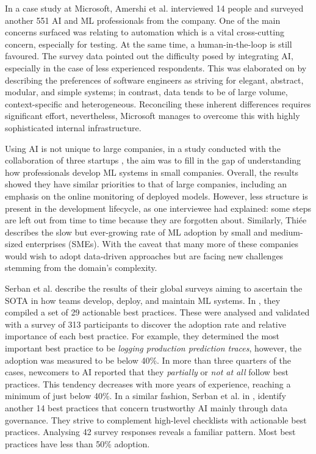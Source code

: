 In a case study at Microsoft, Amershi et al. \cite{amershi2019software} interviewed 14 people and surveyed another 551 AI and ML professionals from the company. One of the main concerns surfaced was relating to automation which is a vital cross-cutting concern, especially for testing. At the same time, a human-in-the-loop is still favoured. The survey data pointed out the difficulty posed by integrating AI, especially in the case of less experienced respondents. This was elaborated on by describing the preferences of software engineers as striving for elegant, abstract, modular, and simple systems; in contrast, data tends to be of large volume, context-specific and heterogeneous. Reconciling these inherent differences requires significant effort, nevertheless, Microsoft manages to overcome this with highly sophisticated internal infrastructure.

Using AI is not unique to large companies, in a study conducted with the collaboration of three startups \cite{de2019understanding}, the aim was to fill in the gap of understanding how professionals develop ML systems in small companies. Overall, the results showed they have similar priorities to that of large companies, including an emphasis on the online monitoring of deployed models. However, less structure is present in the development lifecycle, as one interviewee had explained: some steps are left out from time to time because they are forgotten about.
Similarly, Thiée \cite{thiee2021systematic} describes the slow but ever-growing rate of ML adoption by small and medium-sized enterprises (SMEs). With the caveat that many more of these companies would wish to adopt data-driven approaches but are facing new challenges stemming from the domain's complexity.

Serban et al. \cite{serban2020adoption,serban2021practices} describe the results of their global surveys aiming to ascertain the SOTA in how teams develop, deploy, and maintain ML systems. In \cite{serban2020adoption}, they compiled a set of 29 actionable best practices. These were analysed and validated with a survey of 313 participants to discover the adoption rate and relative importance of each best practice. For example, they determined the most important best practice to be \textit{logging production prediction traces}, however, the adoption was measured to be below 40\%. In more than three quarters of the cases, newcomers to AI reported that they \textit{partially} or \textit{not at all} follow best practices. This tendency decreases with more years of experience, reaching a minimum of just below 40\%. In a similar fashion, Serban et al. in \cite{serban2021practices}, identify another 14 best practices that concern trustworthy AI mainly through data governance. They strive to complement high-level checklists with actionable best practices. Analysing 42 survey responses reveals a familiar pattern. Most best practices have less than 50\% adoption.

